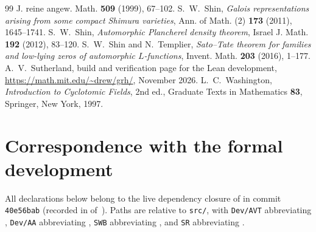 \documentclass[11pt]{amsart}
\theoremstyle{plain}
\theoremstyle{definition}
\numberwithin{equation}{section}
\begin{document}
\begin{thebibliography}{99}
  J. reine angew. Math. \textbf{509} (1999), 67--102.
 S.~W.~Shin, \emph{Galois representations arising from some compact Shimura
  varieties}, Ann. of Math. (2) \textbf{173} (2011), 1645--1741.
 S.~W.~Shin, \emph{Automorphic Plancherel density theorem}, Israel J.
  Math. \textbf{192} (2012), 83--120.
 S.~W.~Shin and N.~Templier, \emph{Sato--Tate theorem for families and
  low-lying zeros of automorphic $L$-functions}, Invent. Math. \textbf{203} (2016), 1--177.
 A.~V.~Sutherland, build and verification page for the Lean development,
  \url{https://math.mit.edu/~drew/grh/}, November 2026.
 L.~C.~Washington, \emph{Introduction to Cyclotomic Fields}, 2nd ed.,
  Graduate Texts in Mathematics \textbf{83}, Springer, New York, 1997.
\end{thebibliography}

\appendix

\section{Correspondence with the formal development}\label{app:lean}

All declarations below belong to the live dependency closure of  in commit
\texttt{40e56bab} (recorded in  of~\cite{dixit-repo}). Paths are
relative to \texttt{src/}, with \texttt{Dev/AVT} abbreviating
, \texttt{Dev/AA} abbreviating
, \texttt{SWB} abbreviating
, and \texttt{SR} abbreviating
.
\end{document}
